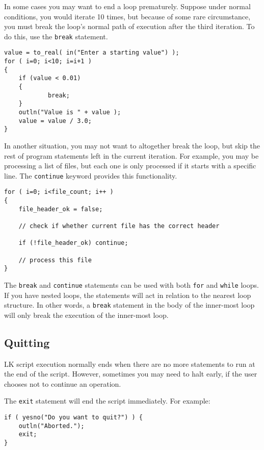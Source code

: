 \documentclass{article}
\begin{document}
In some cases you may want to end a loop prematurely.  Suppose under normal conditions, you would iterate 10 times, but because of some rare circumstance, you must break the loop's normal path of execution after the third iteration.  To do this, use the \texttt{break} statement.

\begin{verbatim}
value = to_real( in("Enter a starting value") );
for ( i=0; i<10; i=i+1 )
{
    if (value < 0.01)
    {
    	    break;
	}
    outln("Value is " + value );
    value = value / 3.0;
}
\end{verbatim}

In another situation, you may not want to altogether break the loop, but skip the rest of program statements left in the current iteration.  For example, you may be processing a list of files, but each one is only processed if it starts with a specific line.  The \texttt{continue} keyword provides this functionality.

\begin{verbatim}
for ( i=0; i<file_count; i++ )
{
    file_header_ok = false;
    
    // check if whether current file has the correct header
    
    if (!file_header_ok) continue;
    
    // process this file
}
\end{verbatim}

The \texttt{break} and \texttt{continue} statements can be used with both \texttt{for} and \texttt{while} loops.  If you have nested loops, the statements will act in relation to the nearest loop structure.  In other words, a \texttt{break} statement in the body of the inner-most loop will only break the execution of the inner-most loop.

\subsection{Quitting}

LK script execution normally ends when there are no more statements to run at the end of the script.  However, sometimes you may need to halt early, if the user chooses not to continue an operation.

The \texttt{exit} statement will end the script immediately.  For example:

\begin{verbatim}
if ( yesno("Do you want to quit?") ) {
    outln("Aborted.");
    exit;
}
\end{verbatim}
\end{document}
